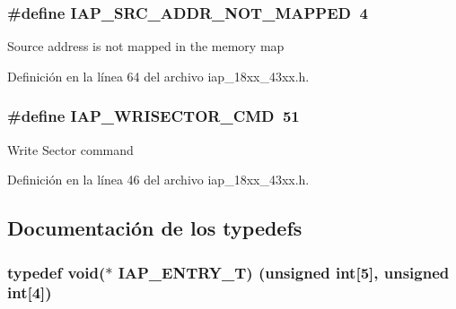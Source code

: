 \subsubsection[{\texorpdfstring{I\+A\+P\+\_\+\+S\+R\+C\+\_\+\+A\+D\+D\+R\+\_\+\+N\+O\+T\+\_\+\+M\+A\+P\+P\+ED}{IAP_SRC_ADDR_NOT_MAPPED}}]{\setlength{\rightskip}{0pt plus 5cm}\#define I\+A\+P\+\_\+\+S\+R\+C\+\_\+\+A\+D\+D\+R\+\_\+\+N\+O\+T\+\_\+\+M\+A\+P\+P\+ED~4}\hypertarget{group___i_a_p__18_x_x__43_x_x_ga8d15cbc501933748afbe786c587e74f9}{}\label{group___i_a_p__18_x_x__43_x_x_ga8d15cbc501933748afbe786c587e74f9}
Source address is not mapped in the memory map 

Definición en la línea 64 del archivo iap\+\_\+18xx\+\_\+43xx.\+h.

\subsubsection[{\texorpdfstring{I\+A\+P\+\_\+\+W\+R\+I\+S\+E\+C\+T\+O\+R\+\_\+\+C\+MD}{IAP_WRISECTOR_CMD}}]{\setlength{\rightskip}{0pt plus 5cm}\#define I\+A\+P\+\_\+\+W\+R\+I\+S\+E\+C\+T\+O\+R\+\_\+\+C\+MD~51}\hypertarget{group___i_a_p__18_x_x__43_x_x_ga9eb15375e6dd4de560a7d43b4483a293}{}\label{group___i_a_p__18_x_x__43_x_x_ga9eb15375e6dd4de560a7d43b4483a293}
Write Sector command 

Definición en la línea 46 del archivo iap\+\_\+18xx\+\_\+43xx.\+h.



\subsection{Documentación de los \textquotesingle{}typedefs\textquotesingle{}}
\subsubsection[{\texorpdfstring{I\+A\+P\+\_\+\+E\+N\+T\+R\+Y\+\_\+T}{IAP_ENTRY_T}}]{\setlength{\rightskip}{0pt plus 5cm}typedef void($\ast$ I\+A\+P\+\_\+\+E\+N\+T\+R\+Y\+\_\+T) (unsigned int\mbox{[}5\mbox{]}, unsigned int\mbox{[}4\mbox{]})}\hypertarget{group___i_a_p__18_x_x__43_x_x_ga07176e9ce6963e57318fa8c127b4f611}{}\label{group___i_a_p__18_x_x__43_x_x_ga07176e9ce6963e57318fa8c127b4f611}


